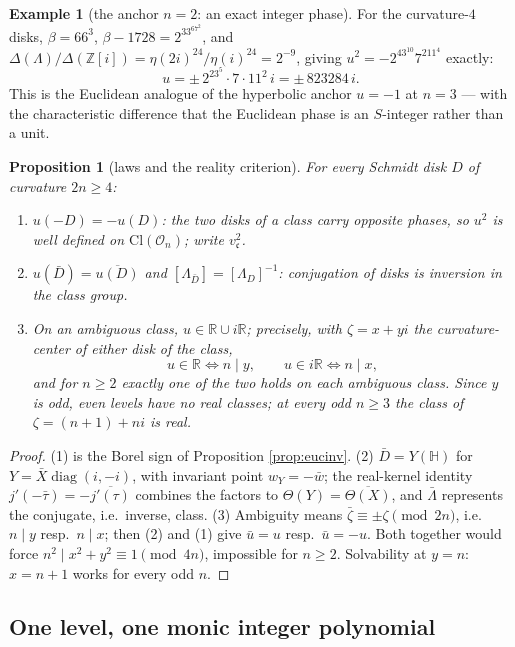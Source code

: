 \documentclass[11pt]{amsart}
\numberwithin{equation}{section}
\theoremstyle{plain}
\newtheorem{proposition}[theorem]{Proposition}
\theoremstyle{definition}
\newtheorem{example}[theorem]{Example}
\theoremstyle{remark}
\newcommand{\R}{\mathbb{R}}
\newcommand{\Z}{\mathbb{Z}}
\newcommand{\HH}{\mathbb{H}}
\newcommand{\Zi}{\Z[i]}
\newcommand{\Cl}{\mathrm{Cl}}
\newcommand{\idealc}{\mathfrak{c}}
\begin{document}
\begin{example}[the anchor $n = 2$: an exact integer phase]
For the curvature-$4$ disks, $\beta = 66^3$, $\beta - 1728 =
2^33^67^2$, and $\Delta(\Lambda)/\Delta(\Zi) = \eta(2i)^{24}/
\eta(i)^{24} = 2^{-9}$, giving $u^2 = -2^43^{10}7^211^4$ exactly:
\[
  u = \pm\,2^23^5\cdot 7\cdot 11^2\,i = \pm\,823284\,i .
\]
This is the Euclidean analogue of the hyperbolic anchor $u = -1$ at
$n = 3$ --- with the characteristic difference that the Euclidean
phase is an $S$-integer rather than a unit.
\end{example}

\begin{proposition}[laws and the reality criterion]\label{prop:euclaws}
For every Schmidt disk $D$ of curvature $2n \ge 4$:
\begin{enumerate}
\item $u(-D) = -u(D)$: the two disks of a class carry opposite phases,
so $u^2$ is well defined on $\Cl(\mathcal{O}_n)$; write
$v_{\idealc}^2$.
\item $u(\bar D) = \overline{u(D)}$ and $[\Lambda_{\bar D}] =
[\Lambda_D]^{-1}$: conjugation of disks is inversion in the class
group.
\item On an ambiguous class, $u \in \R \cup i\R$; precisely, with
$\zeta = x + yi$ the curvature-center of either disk of the class,
\[
  u \in \R \iff n \mid y, \qquad u \in i\R \iff n \mid x,
\]
and for $n \ge 2$ exactly one of the two holds on each ambiguous
class.  Since $y$ is odd, even levels have no real classes; at every
odd $n \ge 3$ the class of $\zeta = (n + 1) + ni$ is real.
\end{enumerate}
\end{proposition}

\begin{proof}
(1) is the Borel sign of Proposition \ref{prop:eucinv}.  (2) $\bar D =
Y(\HH)$ for $Y = \bar X\operatorname{diag}(i, -i)$, with invariant
point $w_Y = -\bar w$; the real-kernel identity $j'(-\bar\tau) =
-\overline{j'(\tau)}$ combines the factors to $\Theta(Y) =
\overline{\Theta(X)}$, and $\bar\Lambda$ represents the conjugate,
i.e.\ inverse, class.  (3) Ambiguity means $\bar\zeta \equiv \pm\zeta
\pmod{2n}$, i.e.\ $n \mid y$ resp.\ $n \mid x$; then (2) and (1) give
$\bar u = u$ resp.\ $\bar u = -u$.  Both together would force $n^2
\mid x^2 + y^2 \equiv 1 \pmod{4n}$, impossible for $n \ge 2$.
Solvability at $y = n$: $x = n + 1$ works for every odd $n$.
\end{proof}

\subsection{One level, one monic integer polynomial}
\label{subsec:eucpoly}
\end{document}
